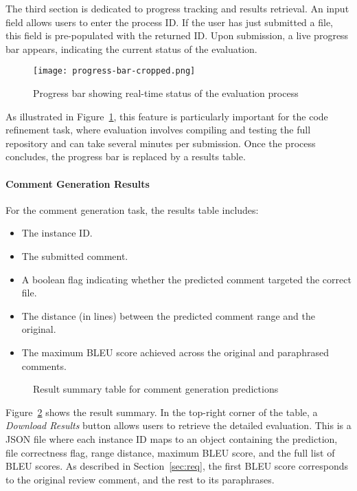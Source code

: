 The third section is dedicated to progress tracking and results retrieval. An input field allows
users to enter the process ID. If the user has just submitted a file, this field is pre-populated
with the returned ID. Upon submission, a live progress bar appears, indicating the current status of
the evaluation.

\begin{figure}[H]
    \centering
    \texttt{[image: progress-bar-cropped.png]}
    \caption{Progress bar showing real-time status of the evaluation process}
    \label{fig:progress-bar}
\end{figure}


As illustrated in Figure~\ref{fig:progress-bar}, this feature is particularly important for the code
refinement task, where evaluation involves compiling and testing the full repository and can take
several minutes per submission. Once the process concludes, the progress bar is replaced by a
results table.

\paragraph{Comment Generation Results}

For the comment generation task, the results table includes:
\begin{itemize}
    \item The instance ID.
    \item The submitted comment.
    \item A boolean flag indicating whether the predicted comment targeted the correct file.
    \item The distance (in lines) between the predicted comment range and the original.
    \item The maximum BLEU score achieved across the original and paraphrased comments.
\end{itemize}

\begin{figure}[H]
    \centering
    \caption{Result summary table for comment generation predictions}
    \label{fig:comment-table}
\end{figure}

Figure~\ref{fig:comment-table} shows the result summary. In the top-right corner of the table, a
\textit{Download Results} button allows users to retrieve the detailed evaluation. This is a JSON
file where each instance ID maps to an object containing the prediction, file correctness flag,
range distance, maximum BLEU score, and the full list of BLEU scores. As described in
Section~\ref{sec:req}, the first BLEU score corresponds to the original review comment, and the rest
to its paraphrases.

